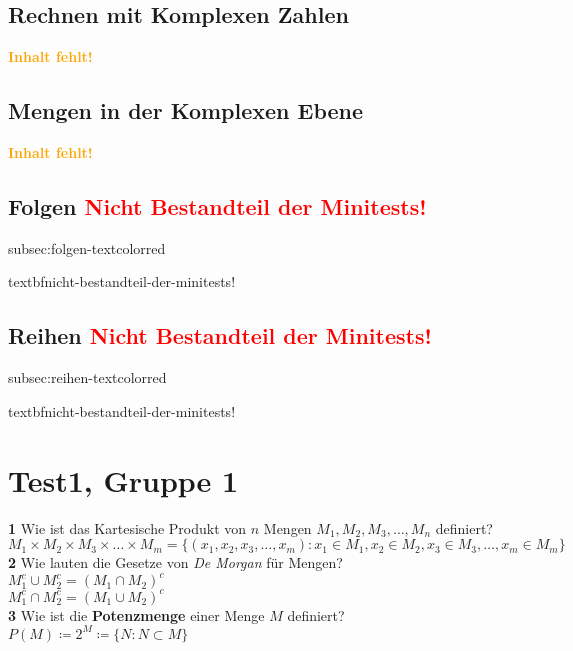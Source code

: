 \documentclass[11pt]{article}
\begin{document}
    \subsection{Rechnen mit Komplexen Zahlen}\label{subsec:rechnen-mit-komplexen-zahlen}
    \textcolor{orange}{\textbf{Inhalt fehlt!}}

    \subsection{Mengen in der Komplexen Ebene}\label{subsec:mengen-in-der-komplexen-ebene}
    \textcolor{orange}{\textbf{Inhalt fehlt!}}

    \subsection{Folgen \textcolor{red}{\textbf{Nicht Bestandteil der Minitests!}}}\label{subsec:2}subsec:folgen-textcolor{red}{textbf{nicht-bestandteil-der-minitests!}

    \subsection{Reihen \textcolor{red}{\textbf{Nicht Bestandteil der Minitests!}}}\label{subsec:}subsec:reihen-textcolor{red}{textbf{nicht-bestandteil-der-minitests!}


    \section{Test1, Gruppe 1}\label{sec:test1-gruppe-1}

    \textbf{1} Wie ist das Kartesische Produkt von $n$ Mengen $M_1, M_2, M_3, \dots, M_n$ definiert?\\
    $M_1 \times M_2 \times M_3 \times \ldots \times M_m = \{ (x_1, x_2, x_3, \ldots, x_m) : x_1 \in M_1, x_2 \in M_2, x_3 \in M_3, \ldots, x_m \in M_m \}$\\

    \textbf{2} Wie lauten die Gesetze von {\itshape De Morgan} für Mengen?\\
    $M_1^c \cup M_2^c = (M_1 \cap M_2)^c$\\
    $M_1^c \cap M_2^c = (M_1 \cup M_2)^c$\\


    \textbf{3} Wie ist die \textbf{Potenzmenge} einer Menge $M$ definiert?\\
    $P(M) \coloneqq 2^M \coloneqq \{ N : N \subset M \}$\\

}}
\end{document}
